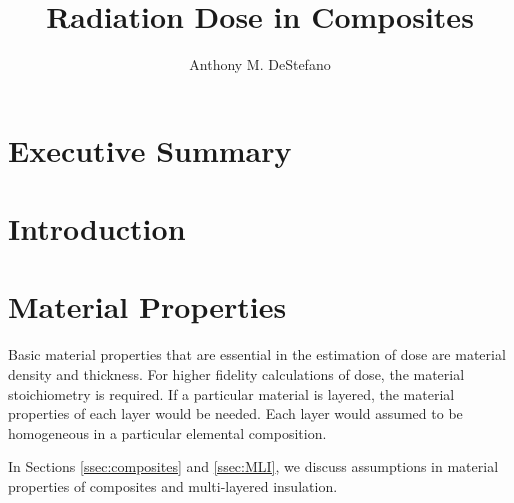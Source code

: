 \documentclass{hitec}
\title{Radiation Dose in Composites}
\author{Anthony M. DeStefano}
\begin{document}
\maketitle
{}

\tableofcontents
\listoffigures
\listoftables
\newpage






\cleardoublepage
{}
%
%
%
\section{Executive Summary}

\section{Introduction}

\section{Material Properties}

Basic material properties that are essential in the estimation of dose are material density and thickness. For higher fidelity calculations of dose, the material stoichiometry is required. If a particular material is layered, the material properties of each layer would be needed. Each layer would assumed to be homogeneous in a particular elemental composition.

In Sections \ref{ssec:composites} and \ref{ssec:MLI}, we discuss assumptions in material properties of composites and multi-layered insulation.
\end{document}
